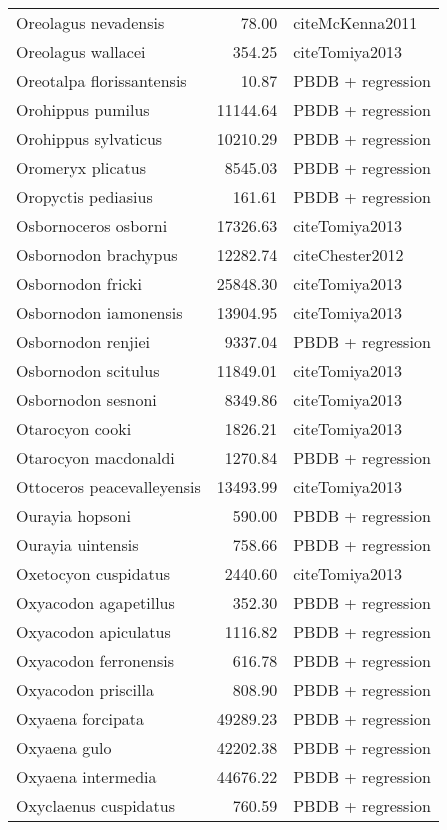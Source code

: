 \begin{table}[ht]
\begin{tabular}{lrl}
  Oreolagus nevadensis & 78.00 & cite{McKenna2011} \\ 
  Oreolagus wallacei & 354.25 & cite{Tomiya2013} \\ 
  Oreotalpa florissantensis & 10.87 & PBDB + regression \\ 
  Orohippus pumilus & 11144.64 & PBDB + regression \\ 
  Orohippus sylvaticus & 10210.29 & PBDB + regression \\ 
  Oromeryx plicatus & 8545.03 & PBDB + regression \\ 
  Oropyctis pediasius & 161.61 & PBDB + regression \\ 
  Osbornoceros osborni & 17326.63 & cite{Tomiya2013} \\ 
  Osbornodon brachypus & 12282.74 & cite{Chester2012} \\ 
  Osbornodon fricki & 25848.30 & cite{Tomiya2013} \\ 
  Osbornodon iamonensis & 13904.95 & cite{Tomiya2013} \\ 
  Osbornodon renjiei & 9337.04 & PBDB + regression \\ 
  Osbornodon scitulus & 11849.01 & cite{Tomiya2013} \\ 
  Osbornodon sesnoni & 8349.86 & cite{Tomiya2013} \\ 
  Otarocyon cooki & 1826.21 & cite{Tomiya2013} \\ 
  Otarocyon macdonaldi & 1270.84 & PBDB + regression \\ 
  Ottoceros peacevalleyensis & 13493.99 & cite{Tomiya2013} \\ 
  Ourayia hopsoni & 590.00 & PBDB + regression \\ 
  Ourayia uintensis & 758.66 & PBDB + regression \\ 
  Oxetocyon cuspidatus & 2440.60 & cite{Tomiya2013} \\ 
  Oxyacodon agapetillus & 352.30 & PBDB + regression \\ 
  Oxyacodon apiculatus & 1116.82 & PBDB + regression \\ 
  Oxyacodon ferronensis & 616.78 & PBDB + regression \\ 
  Oxyacodon priscilla & 808.90 & PBDB + regression \\ 
  Oxyaena forcipata & 49289.23 & PBDB + regression \\ 
  Oxyaena gulo & 42202.38 & PBDB + regression \\ 
  Oxyaena intermedia & 44676.22 & PBDB + regression \\ 
  Oxyclaenus cuspidatus & 760.59 & PBDB + regression \\ 

\end{tabular}
\end{table}
